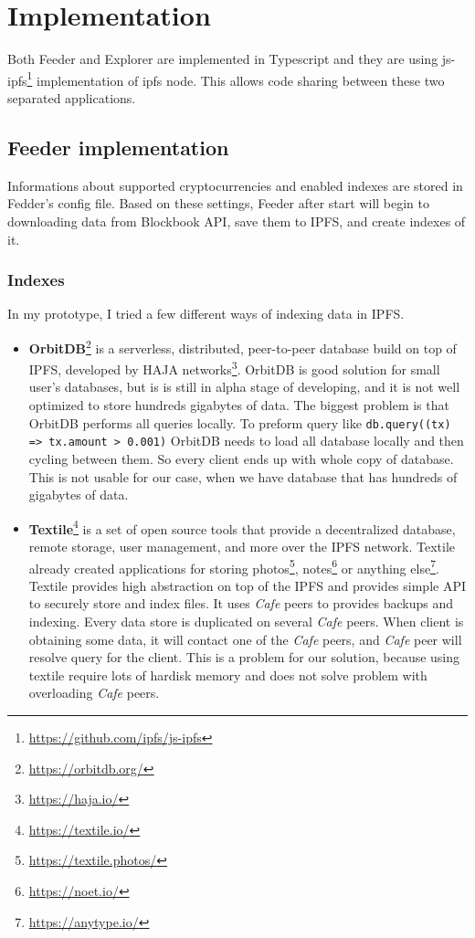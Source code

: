 \chapter{Implementation}

Both Feeder and Explorer are implemented in Typescript and they are using js-ipfs\footnote{\url{https://github.com/ipfs/js-ipfs}} implementation of ipfs node. This allows code sharing between these two separated applications.

\section{Feeder implementation}
Informations about supported cryptocurrencies and enabled indexes are stored in Fedder's config file. Based on these settings, Feeder after start will begin to downloading data from Blockbook API, save them to IPFS, and create indexes of it.

\subsection{Indexes}
In my prototype, I tried a few different ways of indexing data in IPFS.
\begin{itemize}
    \item \textbf{OrbitDB}\footnote{\url{https://orbitdb.org/}} is a serverless, distributed, peer-to-peer database build on top of IPFS, developed by HAJA networks\footnote{\url{https://haja.io/}}. OrbitDB is good solution for small user's databases, but is is still in alpha stage of developing, and it is not well optimized to store hundreds gigabytes of data. The biggest problem is that OrbitDB performs all queries locally. To preform query like \texttt{db.query((tx) => tx.amount > 0.001)} OrbitDB needs to load all database locally and then cycling between them. So every client ends up with whole copy of database. This is not usable for our case, when we have database that has hundreds of gigabytes of data.
    \cite{OrbitDBManual}
    \item \textbf{Textile}\footnote{\url{https://textile.io/}} is a set of open source tools that provide a decentralized database, remote storage, user management, and more over the IPFS network. Textile already created applications for storing photos\footnote{\url{https://textile.photos/}}, notes\footnote{\url{https://noet.io/}} or anything else\footnote{\url{https://anytype.io/}}. Textile provides high abstraction on top of the IPFS and provides simple API to securely store and index files. It uses \textit{Cafe} peers to provides backups and indexing. Every data store is duplicated on several \textit{Cafe} peers. When client is obtaining some data, it will contact one of the \textit{Cafe} peers, and \textit{Cafe} peer will resolve query for the client. This is a problem for our solution, because using textile require lots of hardisk memory and does not solve problem with overloading \textit{Cafe} peers.
    \cite{TextileWhitePaper}
\end{itemize}


